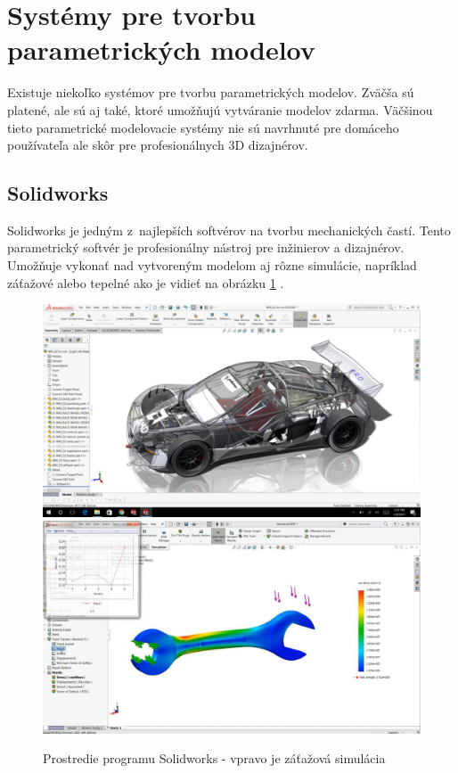 


\section{Systémy pre tvorbu parametrických modelov} \label{sec:Existing_systems}
Existuje niekoľko systémov pre tvorbu parametrických modelov. Zväčša sú platené, ale sú aj také, ktoré umožňujú vytváranie modelov zdarma. Väčšinou tieto parametrické modelovacie systémy nie sú navrhnuté pre domáceho používateľa ale skôr pre profesionálnych 3D dizajnérov.


\subsection*{Solidworks}
Solidworks je jedným z~najlepších softvérov na tvorbu mechanických častí. Tento parametrický softvér je profesionálny nástroj pre inžinierov a dizajnérov. Umožňuje vykonať nad vytvoreným modelom aj rôzne simulácie, napríklad záťažové alebo tepelné ako je vidieť na obrázku \ref{fig:solidworks_simulations} \cite{gaget_2018}.\nopagebreak
\begin{figure}[H]
    \centering
    \includegraphics[width = 0.49\linewidth]{obrazky-figures/programs/solidworks_01.png}
    \includegraphics[width = 0.49\linewidth]{obrazky-figures/programs/solidworks, simulation.jpg}
    \caption{Prostredie programu Solidworks - vpravo je záťažová simulácia \protect\footnotemark
    }
    \label{fig:solidworks_simulations}
\end{figure}


